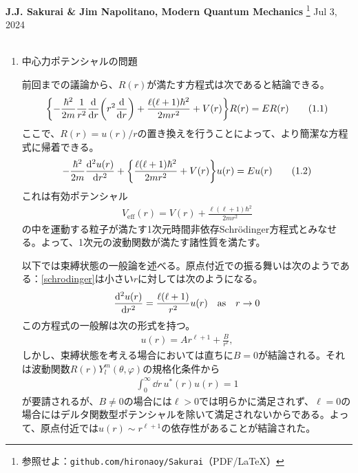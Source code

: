 \documentclass[dvipdfmx]{jarticle}
\theoremstyle{plain}
\begin{document}
\noindent
\textbf{J.J. Sakurai \& Jim Napolitano, Modern Quantum Mechanics}
\footnote{
参照せよ：\texttt{github.com/hironaoy/Sakurai}（PDF/\LaTeX）
}
\hfill Jul 3, 2024\vspace{-2mm} \\
\hrulefill \\

\noindent
\begin{enumerate}
\item 中心力ポテンシャルの問題

  前回までの議論から、$R(r)$が満たす方程式は次であると結論できる。
  \begin{align}
    \qty{-\frac{\hbar^2}{2m}\frac{1}{r^2}\dv{r}\qty(r^2\dv{r}) + \frac{\ell(\ell+1)\hbar^2}{2mr^2} + V(r)}R(r) = E R(r) \tag{1.1}\label{radius}
  \end{align}
  ここで、$R(r) = u(r)/r$の置き換えを行うことによって、より簡潔な方程式に帰着できる。
  \begin{align}
    -\frac{\hbar^2}{2m}\dv[2]{u(r)}{r} + \qty{\frac{\ell(\ell+1)\hbar^2}{2mr^2} + V(r)}u(r) = Eu(r) \tag{1.2}\label{schrodinger}
  \end{align}
  これは有効ポテンシャル
  \begin{align}
    V_{\mathrm{eff}}(r) = V(r) + \frac{\ell (\ell + 1)\hbar^2}{2mr^2}
  \end{align}
  の中を運動する粒子が満たす1次元時間非依存Schrödinger方程式とみなせる。よって、1次元の波動関数が満たす諸性質を満たす。

  以下では束縛状態の一般論を述べる。原点付近での振る舞いは次のようである：\eqref{schrodinger}は小さい$r$に対しては次のようになる。
  \begin{align}
    \dv[2]{u(r)}{r} = \frac{\ell(\ell + 1)}{r^2}u(r) \quad \mathrm{as} \quad r \rightarrow 0
  \end{align}
  この方程式の一般解は次の形式を持つ。
  \begin{align}
    u(r) = Ar^{\ell + 1} + \frac{B}{r^{\ell}}, 
  \end{align}
  しかし、束縛状態を考える場合においては直ちに$B = 0$が結論される。それは波動関数$R(r)Y^{m}_{l}(\theta, \varphi)$の規格化条件から
  \begin{align}
    \int_{0}^{\infty} \dd r \, u^*(r)u(r) = 1
  \end{align}
  が要請されるが、$B \ne 0$の場合には$\ell > 0$では明らかに満足されず、$\ell = 0$の場合にはデルタ関数型ポテンシャルを除いて満足されないからである。よって、原点付近では$u(r) \sim r^{\ell + 1}$の依存性があることが結論された。


\end{enumerate}
\end{document}
